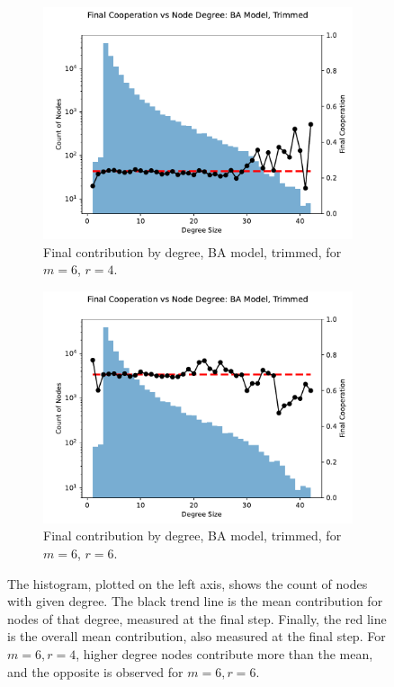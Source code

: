 \FloatBarrier 
\begin{figure}[!h]
  \begin{subfigure}[b]{0.45\textwidth}
    \includegraphics[width=1.1\textwidth]{images/Rep_BA_node_groups_m_6_phi_4_trimmed.pdf}
    \caption{Final contribution by degree, BA model, trimmed, for $m=6$, $r=4$.   }
    \label{by_degree_m_6_phi_4}
  \end{subfigure}
  \hfill
  \begin{subfigure}[b]{0.45\textwidth}
    \includegraphics[width=1.1\textwidth]{images/Rep_BA_node_groups_m_6_phi_6_trimmed.pdf}
    \caption{Final contribution by degree, BA model, trimmed, for $m=6$, $r=6$. }
    \label{by_degree_m_6_phi_6}
  \end{subfigure}
  \caption{The histogram, plotted on the left axis, shows the count of nodes with given degree. The black trend line is the mean contribution for nodes of that degree, measured at the final step. Finally, the red line is the overall mean contribution, also measured at the final step. For $m=6, r=4$, higher degree nodes contribute more than the mean, and the opposite is observed for $m=6,r=6$.  } \label{by_degree_m_6}
\end{figure} 
\FloatBarrier

